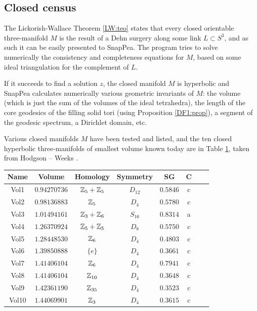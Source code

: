 \subsection{Closed census}
The Lickorish-Wallace Theorem \ref{LW:teo} states that
every closed orientable three-manifold $M$ is the result of a Dehn surgery along some link $L\subset S^3$, and as such it can be easily presented to SnapPea. The program tries to solve numerically the consistency and completeness equations for $M$, based on some ideal triangulation for the complement of $L$.

If it succeeds to find a solution $z$, the closed manifold $M$ is hyperbolic and SnapPea calculates numerically various geometric invariants of $M$: the volume (which is just the sum of the volumes of the ideal tetrahedra), the length of the core geodesics of the filling solid tori (using Proposition \ref{DF1:prop}), a segment of the geodesic spectrum, a Dirichlet domain, etc.

Various closed manifolds $M$ have been tested and listed, and the ten closed hyperbolic three-manifolds of smallest volume known today are in Table \ref{closed:census:table}, taken from Hodgson -- Weeks \cite{Ho-We}.

\begin{table}
\begin{center}
\begin{tabular}{c||ccccccc}
Name & Volume & Homology & Symmetry & SG & C \\
 \hline \hline
Vol1 & $0.94270736$ & $\mathbb{Z}_5+\mathbb{Z}_5$ & $D_{12}$ & $0.5846$ & c \\
Vol2 & $0.98136883$ & $\mathbb{Z}_5$ & $D_{4}$ & $0.5780$ & c \\
Vol3 & $1.01494161$ & $\mathbb{Z}_3 + \mathbb{Z}_6$ & $S_{16}$ & $0.8314$ & a \\
Vol4 & $1.26370924$ & $\mathbb{Z}_5 + \mathbb{Z}_5$ & $D_8$ & $0.5750$ & c \\
Vol5 & $1.28448530$ & $\mathbb{Z}_6$ & $D_4$ & $0.4803$ & c \\
Vol6 & $1.39850888$ & $\{e\}$ & $D_4$ & $0.3661$ & c \\
Vol7 & $1.41406104$ & $\mathbb{Z}_6$ & $D_4$ & $0.7941$ & c \\ 
Vol8 & $1.41406104$ & $\mathbb{Z}_{10}$ & $D_4$ & $0.3648$ & c \\
Vol9 & $1.42361190$ & $\mathbb{Z}_{35}$ & $D_4$ & $0.3523$ & c \\
Vol10 & $1.44069901$ & $\mathbb{Z}_3$ & $D_4$ & $0.3615$ & c
\end{tabular}
\vspace{.2 cm}
\label{closed:census:table}
\end{center}
\end{table}

